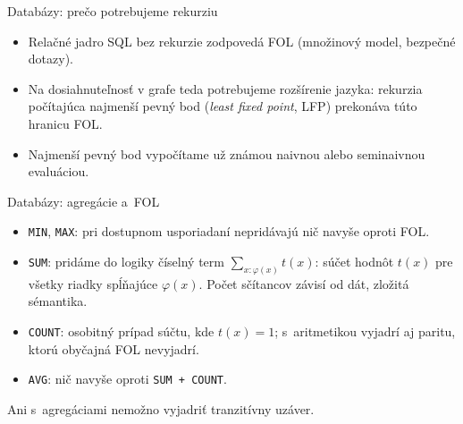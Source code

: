 \documentclass[12pt]{beamer}
\begin{document}
\begin{frame}{Databázy: prečo potrebujeme rekurziu}
  \begin{itemize}
    \item Relačné jadro SQL bez rekurzie zodpovedá FOL
      (množinový model, bezpečné dotazy).
    \item Na dosiahnuteľnosť v grafe teda potrebujeme rozšírenie jazyka:
      rekurzia počítajúca \alert{najmenší pevný bod}
      (\emph{least fixed point}, LFP) prekonáva túto hranicu FOL.
    \item Najmenší pevný bod vypočítame už známou naivnou
      alebo seminaivnou evaluáciou.
  \end{itemize}
\end{frame}

\begin{frame}{Databázy: agregácie a~FOL}
  \begin{itemize}
    \item \texttt{MIN}, \texttt{MAX}: pri dostupnom usporiadaní
      nepridávajú nič navyše oproti FOL.
    \item \texttt{SUM}: pridáme do logiky číselný term
      $\sum_{x:\varphi(x)}t(x)$: súčet hodnôt $t(x)$ pre všetky
      riadky spĺňajúce $\varphi(x)$.
      Počet sčítancov závisí od dát, zložitá sémantika.
    \item \texttt{COUNT}: osobitný prípad súčtu, kde $t(x)=1$;
      s~aritmetikou vyjadrí aj paritu, ktorú obyčajná FOL nevyjadrí.
    \item \texttt{AVG}: nič navyše oproti \texttt{SUM + COUNT}.
  \end{itemize}

  Ani s~agregáciami nemožno vyjadriť tranzitívny uzáver.
\end{frame}
\end{document}
